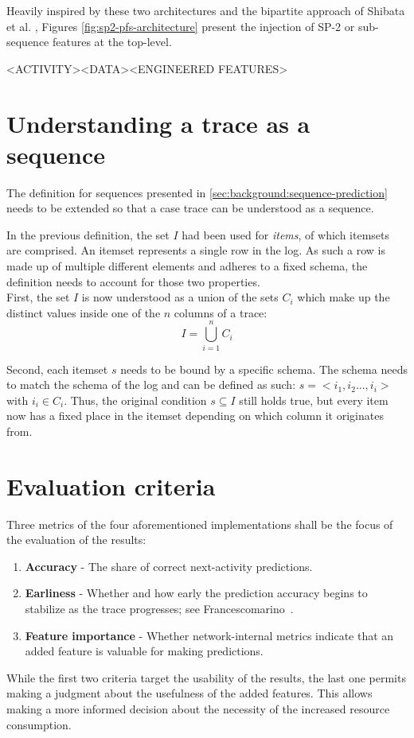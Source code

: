 Heavily inspired by these two architectures and the bipartite approach of Shibata et al. \cite{shibata2016bipartite}, Figures \ref{fig:sp2-pfs-architecture} present the injection of SP-2 or sub-sequence features at the top-level.

<ACTIVITY><DATA><ENGINEERED FEATURES>

\section{Understanding a trace as a sequence}
The definition for sequences presented in \autoref{sec:background:sequence-prediction} needs to be extended so that a case trace can be understood as a sequence.

In the previous definition, the set $I$ had been used for \textit{items}, of which itemsets are comprised. An itemset represents a single row in the log. As such a row is made up of multiple different elements and adheres to a fixed schema, the definition needs to account for those two properties.\\

First, the set $I$ is now understood as a union of the sets $C_i$ which make up the distinct values inside one of the $n$ columns of a trace:
$$I = \bigcup\limits_{i=1}^{n} C_{i}$$

Second, each itemset $s$ needs to be bound by a specific schema. The schema needs to match the schema of the log and can be defined as such: $s = <i_1, i_2 ..., i_i>$ with $i_i \in C_i$. Thus, the original condition $s \subseteq I$ still holds true, but every item now has a fixed place in the itemset depending on which column it originates from.

\section{Evaluation criteria}
Three metrics of the four aforementioned implementations shall be the focus of the evaluation of the results:

\begin{enumerate}
    \item\textbf{Accuracy} - The share of correct next-activity predictions.
    \item\textbf{Earliness} - Whether and how early the prediction accuracy begins to stabilize as the trace progresses; see Francescomarino~\cite{francescomarino2015}.
    \item\textbf{Feature importance} - Whether network-internal metrics indicate that an added feature is valuable for making predictions.
\end{enumerate}

While the first two criteria target the usability of the results, the last one permits making a judgment about the usefulness of the added features. This allows making a more informed decision about the necessity of the increased resource consumption.